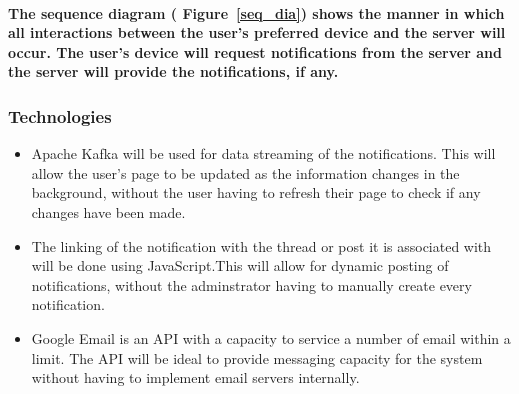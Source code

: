 \documentclass[12pt]{article}
\begin{document}
\paragraph{The sequence diagram ( Figure~\ref{seq_dia}) shows the manner in which all interactions between the user's preferred device and the server will occur. The user's device will request notifications from the server and the server will provide the notifications, if any.}

\subsubsection{Technologies}
\begin{itemize}
\item Apache Kafka will be used for data streaming of the notifications. This will allow the user's page to be updated as the information changes in the background, without the user having to refresh their page to check if any changes have been made.
\item The linking of the notification with the thread or post it is associated with will be done using JavaScript.This will allow for dynamic posting of notifications, without the adminstrator having to manually create every notification.
\item Google Email is an API with a capacity to service a number of email within a limit. The API will be ideal to provide messaging capacity for the system without having to implement email servers internally.
\end{itemize}
\end{document}
